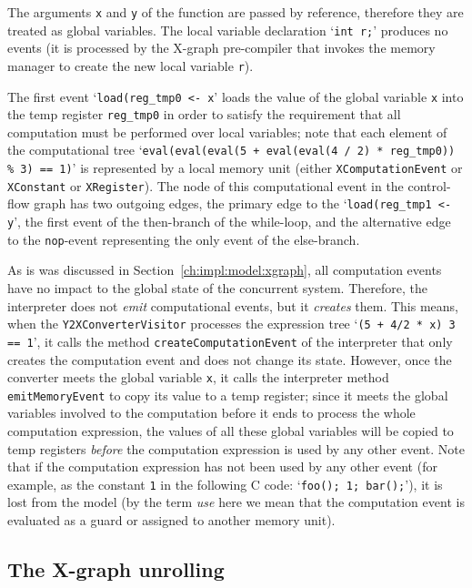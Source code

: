 The arguments \lstinline{x} and \lstinline{y} of the function are passed by reference, therefore they are treated as global variables.
The local variable declaration `\lstinline{int r;}' produces no events (it is processed by the X-graph pre-compiler that invokes the memory manager to create the new local variable \lstinline{r}).

The first event `\lstinline{load(reg_tmp0 <- x}' loads the value of the global variable \lstinline{x} into the temp register \lstinline{reg_tmp0} in order to satisfy the requirement that all computation must be performed over local variables;
note that each element of the computational tree `\lstinline{eval(eval(eval(5 + eval(eval(4 / 2) * reg_tmp0)) % 3) == 1)}' is represented by a local memory unit (either \texttt{XComputationEvent} or \texttt{XConstant} or \texttt{XRegister}).
The node of this computational event in the control-flow graph has two outgoing edges, the primary edge to the `\lstinline{load(reg_tmp1 <- y}', the first event of the then-branch of the while-loop, and the alternative edge to the \lstinline{nop}-event representing the only event of the else-branch.

As is was discussed in Section~\ref{ch:impl:model:xgraph}, all computation events have no impact to the global state of the concurrent system.
Therefore, the interpreter does not \textit{emit} computational events, but it \textit{creates} them.
This means, when the \texttt{Y2XConverterVisitor} processes the expression tree `\lstinline{(5 + 4/2 * x) 3 == 1}', it calls the method \texttt{createComputationEvent} of the interpreter that only creates the computation event and does not change its state.
However, once the converter meets the global variable \lstinline{x}, it calls the interpreter method \texttt{emitMemoryEvent} to copy its value to a temp register; since it meets the global variables involved to the computation before it ends to process the whole computation expression, the values of all these global variables will be copied to temp registers \textit{before} the computation expression is used by any other event.
Note that if the computation expression has not been used by any other event (for example, as the constant \lstinline{1} in the following C code: `\lstinline{foo(); 1; bar();}'), it is lost from the model (by the term \textit{use} here we mean that the computation event is evaluated as a guard or assigned to another memory unit).


\subsection{The X-graph unrolling}
\label{ch:eval:show:unrol}

